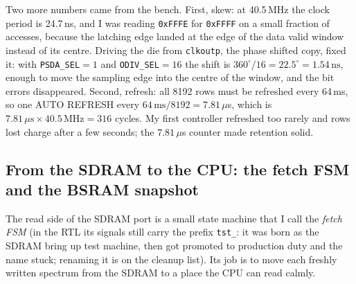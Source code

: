 \documentclass[a4paper,11pt]{article}
\begin{document}
Two more numbers came from the bench. First, skew: at 40.5\,MHz the clock period is
24.7\,ns, and I was reading \texttt{0xFFFE} for \texttt{0xFFFF} on a small fraction of
accesses, because the latching edge landed at the edge of the data valid window
instead of its centre. Driving the die from \texttt{clkoutp}, the phase shifted copy,
fixed it: with \texttt{PSDA\_SEL}$=1$ and \texttt{ODIV\_SEL}$=16$ the shift is
$360^{\circ}/16 = 22.5^{\circ} = 1.54\,\mathrm{ns}$, enough to move the sampling edge
into the centre of the window, and the bit errors disappeared. Second, refresh: all
8192 rows must be refreshed every 64\,ms, so one AUTO REFRESH every
$64\,\mathrm{ms}/8192 = 7.81\,\mu$s, which is $7.81\,\mu\mathrm{s}\times 40.5\,\mathrm{MHz}
= 316$ cycles. My first controller refreshed too rarely and rows lost charge after a
few seconds; the $7.81\,\mu$s counter made retention solid.

\subsection{From the SDRAM to the CPU: the fetch FSM and the BSRAM snapshot}
\label{sec:fetch}

The read side of the SDRAM port is a small state machine that I call the
\emph{fetch FSM} (in the RTL its signals still carry the prefix \texttt{tst\_}: it
was born as the SDRAM bring up test machine, then got promoted to production duty
and the name stuck; renaming it is on the cleanup list). Its job is to move each
freshly written spectrum from the SDRAM to a place the CPU can read calmly.
\end{document}
